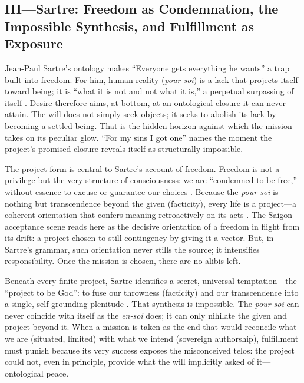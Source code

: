\subsection*{III—Sartre: Freedom as Condemnation, the Impossible Synthesis, and Fulfillment as
	Exposure}
\label{ssec:iii-sartre}
Jean-Paul Sartre's ontology makes ``Everyone gets everything he wants'' a trap built into
freedom. For him, human reality (\emph{pour-soi}) is a lack that projects itself toward being;
it is ``what
it is not and not what it is,'' a perpetual surpassing of itself
\parencite[pp.~100--110]{SartreBN2003}. Desire therefore aims, at bottom, at an ontological
closure it can never attain. The will does not simply seek objects; it seeks to abolish its
lack by becoming a settled being. That is the hidden horizon against which the mission takes on
its peculiar glow. ``For my sins I got one'' names the moment the project's promised closure
reveals itself as structurally impossible.

The project-form is central to Sartre's account of freedom. Freedom is not a privilege but the
very structure of consciousness: we are ``condemned to be free,'' without essence to excuse or
guarantee our choices \parencite[pp.~34--36]{SartreBN2003}. Because the \emph{pour-soi} is
nothing but transcendence beyond the given (facticity), every life is a project—a coherent
orientation that confers meaning retroactively on its acts
\parencite[pp.~561--569]{SartreBN2003}. The Saigon acceptance scene reads here as the decisive
orientation of a freedom in flight from its drift: a project chosen to still contingency by
giving it a vector. But, in Sartre's grammar, such orientation never stills the source; it
intensifies responsibility. Once the mission is chosen, there are no alibis left.

Beneath every finite project, Sartre identifies a secret, universal temptation—the ``project to
be God'': to fuse our throwness (facticity) and our transcendence into a single, self-grounding
plenitude \parencite[pp.~586--604]{SartreBN2003}. That synthesis is impossible. The
\emph{pour-soi} can never coincide with itself as the \emph{en-soi} does; it can only nihilate
the given and project beyond it. When a mission is taken as the end that would reconcile what
we are (situated, limited) with what we intend (sovereign authorship), fulfillment must punish
because its very success exposes the misconceived telos: the project could not, even in
principle, provide what the will implicitly asked of it—ontological peace.

